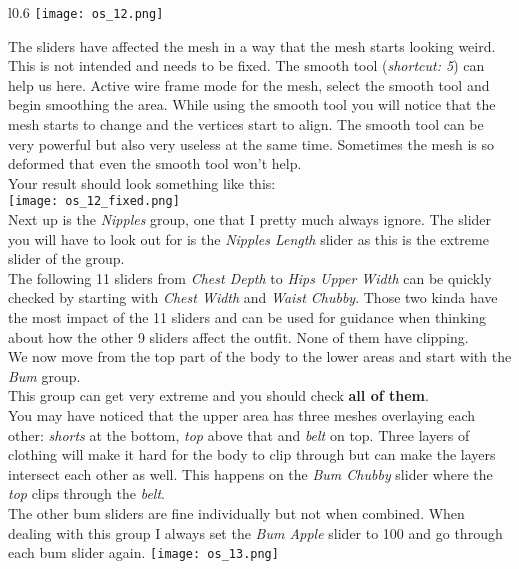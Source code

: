 \begin{wrapfigure}{l}{0.6\textwidth}
    \vspace{-10pt}
    \texttt{[image: os\_12.png]}
\end{wrapfigure}
The sliders have affected the mesh in a way that the mesh starts looking weird. This is not intended and needs to be fixed.
The smooth tool (\textit{shortcut: 5}) can help us here. Active wire frame mode for the mesh, select the smooth tool and begin 
smoothing the area. While using the smooth tool you will notice that the mesh starts to change and the vertices start to align.
The smooth tool can be very powerful but also very useless at the same time. Sometimes the mesh is so deformed that even the 
smooth tool won't help.\\
\linebreak
Your result should look something like this:\\
\texttt{[image: os\_12\_fixed.png]}\\
Next up is the \textit{Nipples} group, one that I pretty much always ignore. The slider you will have to look out for is the 
\textit{Nipples Length} slider as this is the extreme slider of the group.\\
The following 11 sliders from \textit{Chest Depth} to \textit{Hips Upper Width} can be quickly checked by starting with 
\textit{Chest Width} and \textit{Waist Chubby}. Those two kinda have the most impact of the 11 sliders and can be used for guidance 
when thinking about how the other 9 sliders affect the outfit. None of them have clipping.\\
We now move from the top part of the body to the lower areas and start with the \textit{Bum} group.\\
This group can get very extreme and you should check \textbf{all of them}.\\ You may have noticed that the upper area has three meshes 
overlaying each other: \textit{shorts} at the bottom, \textit{top} above that and \textit{belt} on top. Three layers of clothing 
will make it hard for the body to clip through but can make the layers intersect each other as well. This happens on the 
\textit{Bum Chubby} slider where the \textit{top} clips through the \textit{belt}.\\
The other bum sliders are fine individually but not when combined. When dealing with this group I always set the \textit{Bum Apple}
slider to 100 and go through each bum slider again.
\texttt{[image: os\_13.png]}\\
